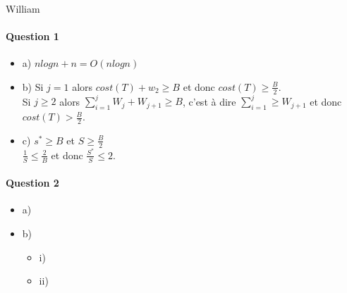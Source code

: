 William
\paragraph{Question 1}
\begin{itemize}
\item a) $nlogn+n = O(nlogn)$
\item b) Si $j = 1$ alors $cost(T) + w_{2} \geqslant B$ et donc $cost(T) \geqslant \frac{B}{2}$.\\
Si $j \geqslant 2$ alors $\sum_{i=1}^{j} W_{j} + W_{j+1} \geqslant B$, c'est à dire $\sum_{i=1}^{j} \geqslant W_{j+1}$ et donc $cost(T) > \frac{B}{2}$.
\item c)  $s^{*} \geqslant B$ et $S \geqslant \frac{B}{2}$\\
$\frac{1}{S} \leqslant \frac{2}{B}$ et donc $\frac{S^{*}}{S} \leqslant 2$.
\end{itemize}

\paragraph{Question 2}
\begin{itemize}
\item a) 
\item b)

\begin{itemize}
\item i)
\item ii)
\end{itemize}
\end{itemize}